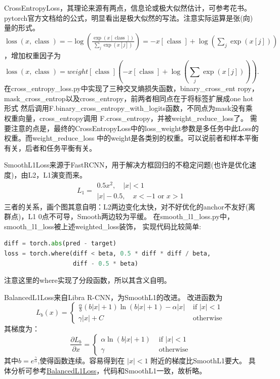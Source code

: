 \documentclass[UTF8]{ctexart}
\begin{document}
CrossEntropyLoss，其理论来源有两点，信息论或极大似然估计，可参考花书。
pytorch官方文档给的公式，明显看出是极大似然的写法。注意实际运算是张(向)量的形式。
$\operatorname{loss}(x, \text { class })=-\log \left(\frac{\exp (x[\text { class }])}{\sum_{j} \exp (x[j])}\right)=
-x[\text { class }]+\log \left(\sum_{j} \exp (x[j])\right)$，增加权重因子为
$$\operatorname{loss}(x, \text { class })=
w e i g h t[\text { class }]
\left(-x[\text { class }]+\log \left(\sum_{j} \exp (x[j])\right)\right).$$
在cross\_entropy\_loss.py中实现了三种交叉熵损失函数，binary\_cross\_ent
ropy， mask\_cross\_entrop以及cross\_entropy，前两者相同点在于将标签扩展成one hot形式
然后调用F.binary\_cross\_entropy\_with\_logits函数，不同点为mask没有乘权重向量，cross\_entropy调用
F.cross\_entropy，并被weight\_reduce\_loss了。
需要注意的点是，最终的CrossEntropyLoss中的loss\_weight参数是多任务中此Loss的权重。而weight\_reduce\_loss
中的weight是各类别的权重。可以说前者和样本平衡有关，后者和任务平衡有关。

SmoothL1Loss来源于FastRCNN，用于解决方框回归的不稳定问题(也许是优化速度)，由L2，L1演变而来。
$$L_{1}=\begin{array}{l}
	0.5 x^{2}, \quad|x|<1 \\
	|x|-0.5, \quad x<-1 \text { or } x>1
	\end{array}$$
三者的关系，画个图其意自明：L2两边变化太快，对不好优化的anchor不友好(离群点)，L1 0点不可导，Smooth两边较为平缓。
在smooth\_l1\_loss.py中，smooth\_l1\_loss被上述weighted\_loss装饰，
实现代码比较简单:
\lstset{style=mystyle}
\begin{lstlisting}[language=Python]
diff = torch.abs(pred - target)
loss = torch.where(diff < beta, 0.5 * diff * diff / beta,
				   diff - 0.5 * beta)
\end{lstlisting}
注意这里的where实现了分段函数，所以其含义自明。

BalancedL1Loss来自Libra R-CNN，为SmoothL1的改进。
改进函数为
$$
L_{b}(x)=\left\{\begin{array}{ll}
	\frac{\alpha}{b}(b|x|+1) \ln (b|x|+1)-\alpha|x| & \text { if }|x|<1 \\
	\gamma|x|+C & \text { otherwise }
	\end{array}\right.
$$
其梯度为：
$$
\frac{\partial L_{b}}{\partial x}=\left\{\begin{array}{ll}
	\alpha \ln (b|x|+1) & \text { if }|x|<1 \\
	\gamma & \text { otherwise }
	\end{array}\right.
$$
其中$b=e^{\frac{\gamma}{\alpha}}$,使得函数连续。容易得到在 $|x|<1$ 附近的梯度比SmoothL1要大。
具体分析可参考\href{https://zhuanlan.zhihu.com/p/64541760}{BalancedL1Loss}，代码和SmoothL1一致，故析略。
\end{document}
